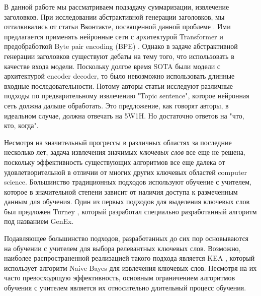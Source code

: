 \documentclass[14pt]{matmex-diploma-custom}
\begin{document}
В данной работе мы рассматриваем подзадачу суммаризации, извлечение заголовков. При исследовании абстрактивной генерации заголовков, мы отталкивались от статьи Вконтакте, посвященной данной проблеме \cite{gavrilov2018self}. Ими предлагается применять нейронные сети с архитектурой Transformer и предобработкой Byte pair encoding (BPE) \cite{DBLP:journals/corr/SennrichHB15}. Однако в задаче абстрактивной генерации заголовков существуют дебаты на тему того, что использовать в качестве входа модели. Поскольку долгое время SOTA были модели с архитектурой encoder decoder, то было невозможно использовать длинные входные последовательности. Потому авторы статьи \cite{Putra2018IncorporatingTS} исследуют различные подходы по предварительному извлечению "Topic sentence", которое нейронная сеть должна дальше обработать. Это предложение, как говорят авторы, в идеальном случае, должна отвечать на 5W1H. Но достаточно ответов на "что, кто, когда".



Несмотря на значительный прогрессы в различных областях за последние несколько лет, задача извлечения значимых \textit{ключевых слов} все еще не решена, поскольку эффективность существующих алгоритмов все еще далека от удовлетворительной в отличии от многих других ключевых областей computer science. Большинство традиционных подходов используют обучение с учителем, которое в значительной степени зависит от наличия доступа к размеченным данным для обучения. Один из первых подходов для выделения ключевых слов был предложен Turney \cite{Turney2000LearningAF}, который разработал специально разработанный алгоритм под названием GenEx.

Подавляющее большинство подходов, разработанных до сих пор основываются на обучении с учителем для выбора релевантных ключевых слов. Возможно, наиболее распространенной реализацией такого подхода является KEA \cite{Witten:1999:KPA:313238.313437}, который использует алгоритм Naive Bayes для извлечения ключевых слов. Несмотря на их часто превосходящую эффективность, основным ограничением алгоритмов обучения с учителем является их относительно длительный процесс обучения.
\end{document}

